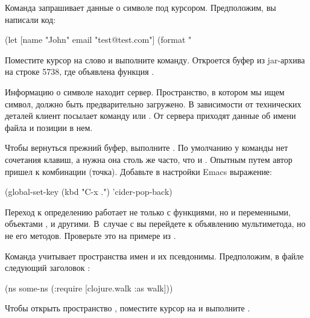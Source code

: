 Команда  запрашивает данные о символе под курсором. Предположим, вы написали код:

\begin{english}
  \begin{clojure}
(let [name "John"
      email "test@test.com"]
  (format "%
  \end{clojure}
\end{english}

Поместите курсор на слово  и выполните команду. Откроется буфер  из jar-архива на строке 5738, где объявлена функция .

Информацию о символе находит сервер. Пространство, в котором мы ищем символ, должно быть предварительно загружено. В зависимости от технических деталей клиент посылает команду  или . От сервера приходят данные об имени файла и позиции в нем.

Чтобы вернуться прежний буфер, выполните . По умолчанию у команды нет сочетания клавиш, а нужна она столь же часто, что и . Опытным путем автор пришел к комбинации  (точка). Добавьте в настройки Emacs выражение:

\begin{english}
  \begin{lisp}
(global-set-key (kbd "C-x .") 'cider-pop-back)
  \end{lisp}
\end{english}

Переход к определению работает не только с функциями, но и переменными, объектами ,  и другими. В~случае с  вы перейдете к объявлению мультиметода, но не его методов. Проверьте это на примере  из .

Команда  учитывает пространства имен и их псевдонимы. Предположим, в файле следующий заголовок :

\begin{english}
  \begin{clojure}
(ns some-ns
  (:require
   [clojure.walk :as walk]))
  \end{clojure}
\end{english}

Чтобы открыть пространство , поместите курсор на  и выполните .

\def\urlemacsxref{https://www.gnu.org/software/emacs/manual/html\_node/emacs/Xref.html}

